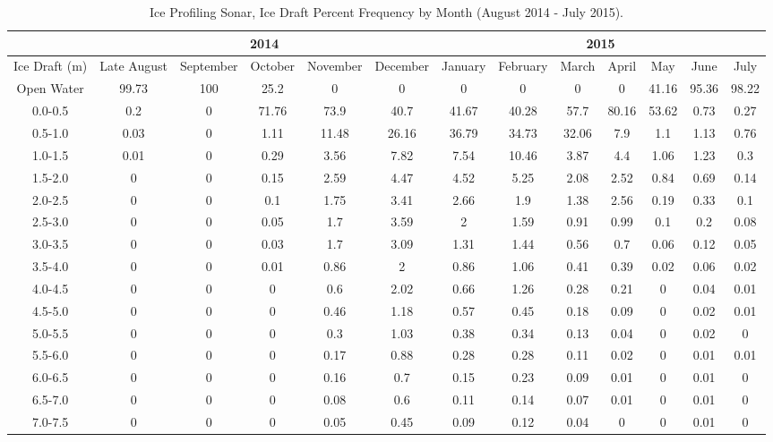 \documentclass[12pt]{dforeport}
\begin{document}
\begin{landscape}

\begin{table}[ht]
\centering
\caption[Ice Draft Percent Frequency]{Ice Profiling Sonar, Ice Draft Percent Frequency by Month (August 2014 - July 2015).}
\label{t:ids_pf_2014_2015}
\begin{tabular}{c | c c c c c | c c c c c c c}
\toprule
& \multicolumn{5}{c}{\textbf{2014}} & \multicolumn{7}{c}{\textbf{2015}} \\
\midrule
Ice Draft (m) & Late August & September & October & November & December & January & February & March & April & May & June & July \\ \midrule
Open Water & 99.73 & 100 & 25.2 & 0 & 0 & 0 & 0 & 0 & 0 & 41.16 & 95.36 & 98.22\\
0.0-0.5 & 0.2 & 0 & 71.76 & 73.9 & 40.7 & 41.67 & 40.28 & 57.7 & 80.16 & 53.62 & 0.73 & 0.27\\
0.5-1.0 & 0.03 & 0 & 1.11 & 11.48 & 26.16 & 36.79 & 34.73 & 32.06 & 7.9 & 1.1 & 1.13 & 0.76\\
1.0-1.5 & 0.01 & 0 & 0.29 & 3.56 & 7.82 & 7.54 & 10.46 & 3.87 & 4.4 & 1.06 & 1.23 & 0.3\\
1.5-2.0 & 0 & 0 & 0.15 & 2.59 & 4.47 & 4.52 & 5.25 & 2.08 & 2.52 & 0.84 & 0.69 & 0.14\\
2.0-2.5 & 0 & 0 & 0.1 & 1.75 & 3.41 & 2.66 & 1.9 & 1.38 & 2.56 & 0.19 & 0.33 & 0.1\\
2.5-3.0 & 0 & 0 & 0.05 & 1.7 & 3.59 & 2 & 1.59 & 0.91 & 0.99 & 0.1 & 0.2 & 0.08\\
3.0-3.5 & 0 & 0 & 0.03 & 1.7 & 3.09 & 1.31 & 1.44 & 0.56 & 0.7 & 0.06 & 0.12 & 0.05\\
3.5-4.0 & 0 & 0 & 0.01 & 0.86 & 2 & 0.86 & 1.06 & 0.41 & 0.39 & 0.02 & 0.06 & 0.02\\
4.0-4.5 & 0 & 0 & 0 & 0.6 & 2.02 & 0.66 & 1.26 & 0.28 & 0.21 & 0 & 0.04 & 0.01\\
4.5-5.0 & 0 & 0 & 0 & 0.46 & 1.18 & 0.57 & 0.45 & 0.18 & 0.09 & 0 & 0.02 & 0.01\\
5.0-5.5 & 0 & 0 & 0 & 0.3 & 1.03 & 0.38 & 0.34 & 0.13 & 0.04 & 0 & 0.02 & 0\\
5.5-6.0 & 0 & 0 & 0 & 0.17 & 0.88 & 0.28 & 0.28 & 0.11 & 0.02 & 0 & 0.01 & 0.01\\
6.0-6.5 & 0 & 0 & 0 & 0.16 & 0.7 & 0.15 & 0.23 & 0.09 & 0.01 & 0 & 0.01 & 0\\
6.5-7.0 & 0 & 0 & 0 & 0.08 & 0.6 & 0.11 & 0.14 & 0.07 & 0.01 & 0 & 0.01 & 0\\
7.0-7.5 & 0 & 0 & 0 & 0.05 & 0.45 & 0.09 & 0.12 & 0.04 & 0 & 0 & 0.01 & 0\\

\end{tabular}
\end{table}
\end{landscape}
\end{document}
